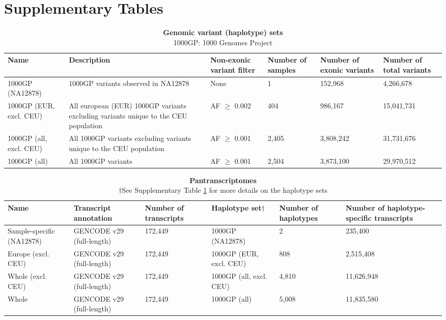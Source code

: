 \documentclass[11pt]{ucthesis}
\begin{document}
\section{Supplementary Tables}

\begin{table}[H]
\footnotesize
\begin{tabular}{L{0.13\textwidth}| L{0.25\textwidth} | R{0.12\textwidth} | R{0.1\textwidth} | R{0.11\textwidth} | R{0.11\textwidth}}
\textbf{Name} & \textbf{Description} & \textbf{Non-exonic variant filter} & \textbf{Number of samples} & \textbf{Number of exonic variants} & \textbf{Number of total variants} \\
\midrule
1000GP (NA12878)& 1000GP variants observed in NA12878 & None & 1 & 152,968 & 4,266,678 \\
\midrule
1000GP (EUR, excl. CEU) & All european (EUR) 1000GP variants excluding variants unique to the CEU population & AF $\geq$ 0.002 & 404 & 986,167 & 15,041,731 \\
\midrule
1000GP (all, excl. CEU) & All 1000GP variants excluding variants unique to the CEU population & AF $\geq$ 0.001 & 2,405 & 3,808,242 & 31,731,676 \\
\midrule
1000GP (all) & All 1000GP variants & AF $\geq$ 0.001 & 2,504 & 3,873,100 & 29,970,512
\end{tabular}
\caption{\textbf{Genomic variant (haplotype) sets} \\
1000GP: 1000 Genomes Project}
\label{tab:haplotype-sets}
\end{table}

\begin{table}[H]
\footnotesize
\begin{tabular}{L{0.13\textwidth} | L{0.14\textwidth} | R{0.12\textwidth} | L{0.13\textwidth} | R{0.11\textwidth} | R{0.17\textwidth}}
\textbf{Name} & \textbf{Transcript annotation} & \textbf{Number of transcripts} & \textbf{Haplotype set}$\dag$ & \textbf{Number of haplotypes} & \textbf{Number of haplotype-specific transcripts} \\
\midrule
Sample-specific (NA12878)& GENCODE v29 (full-length) & 172,449 & 1000GP (NA12878) & 2 & 235,400 \\
\midrule
Europe (excl. CEU) & GENCODE v29 (full-length) & 172,449 & 1000GP (EUR, excl. CEU) & 808 & 2,515,408 \\
\midrule
Whole (excl. CEU) & GENCODE v29 (full-length) & 172,449 & 1000GP (all, excl. CEU) & 4,810 & 11,626,948 \\
\midrule
Whole & GENCODE v29 (full-length) & 172,449 & 1000GP (all) & 5,008 & 11,835,580
\end{tabular}
\caption{\textbf{Pantranscriptomes}\\
$\dag$See Supplementary Table \ref{tab:haplotype-sets} for more details on the haplotype sets
}
\label{tab:pantranscriptomes}
\end{table}
\end{document}
